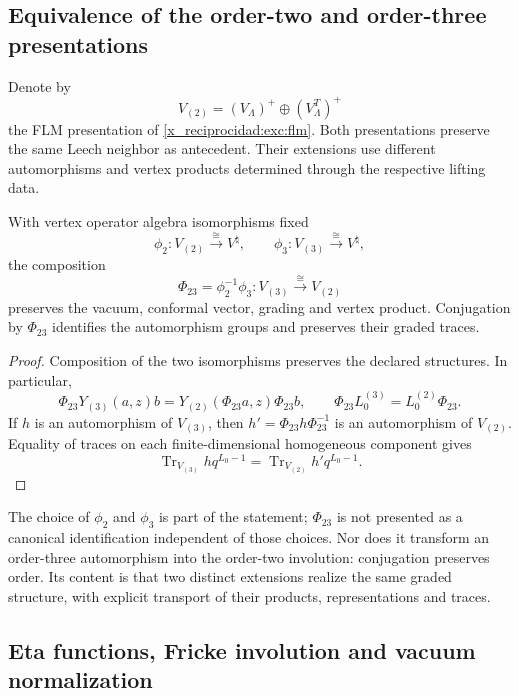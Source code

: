 \subsection{Equivalence of the order-two and order-three presentations}
\label{x_reciprocidad:km:equivalencia-dos-tres}

Denote by
\[
 V_{(2)}=(V_\Lambda)^+\oplus(V_\Lambda^T)^+
\]
the FLM presentation of \eqref{x_reciprocidad:exc:flm}. Both presentations preserve
the same Leech neighbor as antecedent. Their extensions use
different automorphisms and vertex products determined through
the respective lifting data.

\begin{theorem}
\label{x_reciprocidad:km:equivalencia-voa}
With vertex operator algebra isomorphisms fixed
\[
 \phi_2:V_{(2)}\xrightarrow{\ \cong\ }V^\natural,
 \qquad
 \phi_3:V_{(3)}\xrightarrow{\ \cong\ }V^\natural,
\]
the composition
\begin{equation}
 \Phi_{23}=\phi_2^{-1}\phi_3:
 V_{(3)}\xrightarrow{\ \cong\ }V_{(2)}
 \label{x_reciprocidad:km:Phi23}
\end{equation}
preserves the vacuum, conformal vector, grading and vertex
product. Conjugation by \(\Phi_{23}\) identifies the automorphism
groups and preserves their graded traces.
\end{theorem}
\begin{proof}
Composition of the two isomorphisms preserves the declared
structures. In particular,
\[
 \Phi_{23}Y_{(3)}(a,z)b
 =Y_{(2)}(\Phi_{23}a,z)\Phi_{23}b,
 \qquad
 \Phi_{23}L_0^{(3)}=L_0^{(2)}\Phi_{23}.
\]
If \(h\) is an automorphism of \(V_{(3)}\), then
\(h' =\Phi_{23}h\Phi_{23}^{-1}\) is an automorphism of
\(V_{(2)}\). Equality of traces on each finite-dimensional homogeneous
component gives
\[
 \operatorname{Tr}_{V_{(3)}}h q^{L_0-1}
 =\operatorname{Tr}_{V_{(2)}}h' q^{L_0-1}.
\]
\end{proof}

The choice of \(\phi_2\) and \(\phi_3\) is part of the statement;
\(\Phi_{23}\) is not presented as a canonical identification
independent of those choices. Nor does it transform an order-three
automorphism into the order-two involution: conjugation preserves
order. Its content is that two distinct extensions realize the
same graded structure, with explicit transport of their products,
representations and traces.

\subsection{Eta functions, Fricke involution and vacuum normalization}
\label{x_reciprocidad:km:fricke}

